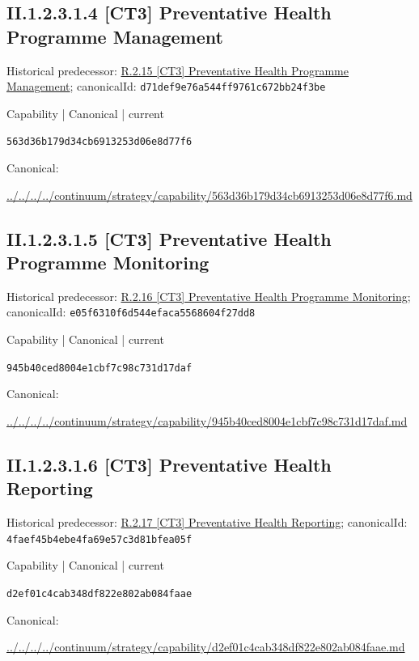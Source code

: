 \documentclass[10pt,a4paper]{article}
\begin{document}
\subsection*{II.1.2.3.1.4 [CT3] Preventative Health Programme Management}
Historical predecessor: \hyperref[element-d71def9e76a544ff9761c672bb24f3be]{R.2.15 [CT3] Preventative Health Programme Management}; canonicalId: \texttt{d71def9e76a544ff9761c672bb24f3be}\par
\label{element-563d36b179d34cb6913253d06e8d77f6}
{\small Capability | Canonical | current}\par
\texttt{563d36b179d34cb6913253d06e8d77f6}\par
Canonical: \par
{\footnotesize\url{../../../../continuum/strategy/capability/563d36b179d34cb6913253d06e8d77f6.md}}\par
\subsection*{II.1.2.3.1.5 [CT3] Preventative Health Programme Monitoring}
Historical predecessor: \hyperref[element-e05f6310f6d544efaca5568604f27dd8]{R.2.16 [CT3] Preventative Health Programme Monitoring}; canonicalId: \texttt{e05f6310f6d544efaca5568604f27dd8}\par
\label{element-945b40ced8004e1cbf7c98c731d17daf}
{\small Capability | Canonical | current}\par
\texttt{945b40ced8004e1cbf7c98c731d17daf}\par
Canonical: \par
{\footnotesize\url{../../../../continuum/strategy/capability/945b40ced8004e1cbf7c98c731d17daf.md}}\par
\subsection*{II.1.2.3.1.6 [CT3] Preventative Health Reporting}
Historical predecessor: \hyperref[element-4faef45b4ebe4fa69e57c3d81bfea05f]{R.2.17 [CT3] Preventative Health Reporting}; canonicalId: \texttt{4faef45b4ebe4fa69e57c3d81bfea05f}\par
\label{element-d2ef01c4cab348df822e802ab084faae}
{\small Capability | Canonical | current}\par
\texttt{d2ef01c4cab348df822e802ab084faae}\par
Canonical: \par
{\footnotesize\url{../../../../continuum/strategy/capability/d2ef01c4cab348df822e802ab084faae.md}}\par
\end{document}

